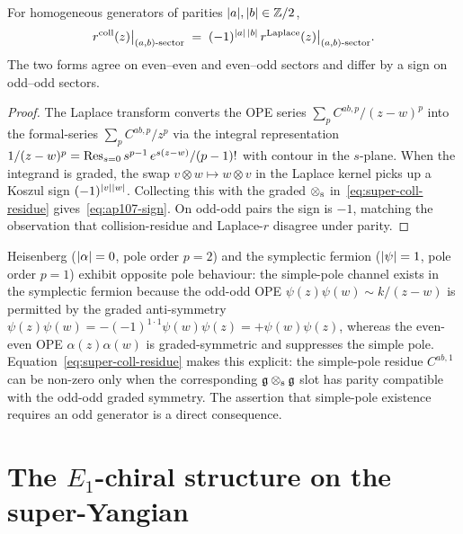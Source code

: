 \begin{lemma}
\label{lem:ap107-sign}
For homogeneous generators of parities $|a|,|b|\in\mathbb{Z}/2$,
\begin{equation}
 \label{eq:ap107-sign}
 r^{\mathrm{coll}}(z)\big|_{(a,b)\text{-sector}}
 \;=\; (-1)^{|a|\,|b|}\, r^{\mathrm{Laplace}}(z)\big|_{(a,b)\text{-sector}}.
\end{equation}
The two forms agree on even--even and even--odd sectors and differ by
a sign on odd--odd sectors.
\end{lemma}

\begin{proof}
The Laplace transform converts the OPE series
$\sum_p C^{ab,p}/(z-w)^p$ into the formal-series
$\sum_p C^{ab,p}/z^p$ via the integral representation $1/(z-w)^p =
\operatorname{Res}_{s=0} s^{p-1}\,e^{s(z-w)}/(p-1)!$ with contour in the $s$-plane.
When the integrand is graded, the swap $v\otimes w\mapsto w\otimes v$
in the Laplace kernel picks up a Koszul sign $(-1)^{|v||w|}$.
Collecting this with the graded $\mathbin{\otimes_{\mathrm{s}}}$ in~\eqref{eq:super-coll-residue}
gives~\eqref{eq:ap107-sign}. On odd-odd pairs the sign is $-1$, matching
the observation that collision-residue and Laplace-$r$ disagree under
parity.
\end{proof}

\begin{remark}
\label{rem:ap105-absorbed}
Heisenberg ($|\alpha|=0$, pole order $p=2$)
and the symplectic fermion ($|\psi|=1$, pole order $p=1$) exhibit
opposite pole behaviour: the simple-pole channel exists in the symplectic
fermion because the odd-odd OPE
$\psi(z)\psi(w)\sim k/(z-w)$ is permitted by the graded anti-symmetry
$\psi(z)\psi(w) = -(-1)^{1\cdot 1}\psi(w)\psi(z)=+\psi(w)\psi(z)$,
whereas the even-even OPE $\alpha(z)\alpha(w)$ is graded-symmetric and
suppresses the simple pole. Equation~\eqref{eq:super-coll-residue}
makes this explicit: the simple-pole residue $C^{ab,1}$ can be non-zero
only when the corresponding $\mathfrak{g}\mathbin{\otimes_{\mathrm{s}}}\mathfrak{g}$ slot has parity compatible
with the odd-odd graded symmetry. The assertion that simple-pole
existence requires an odd generator is a direct consequence.
\end{remark}

\section{The $E_1$-chiral structure on the super-Yangian}
\label{sec:super-e1-structure}


